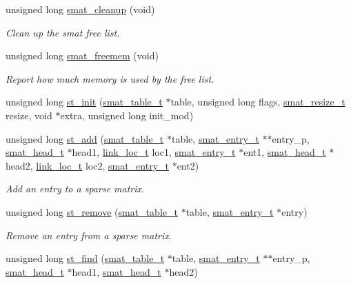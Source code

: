 \begin{CompactItemize}
\item 
unsigned long \hyperlink{group__dbprim__smat_a7}{smat\_\-cleanup} (void)
\begin{CompactList}\small\item\em Clean up the smat free list. \item\end{CompactList}\item 
unsigned long \hyperlink{group__dbprim__smat_a8}{smat\_\-freemem} (void)
\begin{CompactList}\small\item\em Report how much memory is used by the free list. \item\end{CompactList}\item 
unsigned long \hyperlink{group__dbprim__smat_a9}{st\_\-init} (\hyperlink{dbprim_8h_a0}{smat\_\-table\_\-t} $\ast$table, unsigned long flags, \hyperlink{dbprim_8h_a3}{smat\_\-resize\_\-t} resize, void $\ast$extra, unsigned long init\_\-mod)
\item 
unsigned long \hyperlink{group__dbprim__smat_a10}{st\_\-add} (\hyperlink{dbprim_8h_a0}{smat\_\-table\_\-t} $\ast$table, \hyperlink{dbprim_8h_a2}{smat\_\-entry\_\-t} $\ast$$\ast$entry\_\-p, \hyperlink{dbprim_8h_a1}{smat\_\-head\_\-t} $\ast$head1, \hyperlink{dbprim_8h_a4}{link\_\-loc\_\-t} loc1, \hyperlink{dbprim_8h_a2}{smat\_\-entry\_\-t} $\ast$ent1, \hyperlink{dbprim_8h_a1}{smat\_\-head\_\-t} $\ast$head2, \hyperlink{dbprim_8h_a4}{link\_\-loc\_\-t} loc2, \hyperlink{dbprim_8h_a2}{smat\_\-entry\_\-t} $\ast$ent2)
\begin{CompactList}\small\item\em Add an entry to a sparse matrix. \item\end{CompactList}\item 
unsigned long \hyperlink{group__dbprim__smat_a11}{st\_\-remove} (\hyperlink{dbprim_8h_a0}{smat\_\-table\_\-t} $\ast$table, \hyperlink{dbprim_8h_a2}{smat\_\-entry\_\-t} $\ast$entry)
\begin{CompactList}\small\item\em Remove an entry from a sparse matrix. \item\end{CompactList}\item 
unsigned long \hyperlink{group__dbprim__smat_a12}{st\_\-find} (\hyperlink{dbprim_8h_a0}{smat\_\-table\_\-t} $\ast$table, \hyperlink{dbprim_8h_a2}{smat\_\-entry\_\-t} $\ast$$\ast$entry\_\-p, \hyperlink{dbprim_8h_a1}{smat\_\-head\_\-t} $\ast$head1, \hyperlink{dbprim_8h_a1}{smat\_\-head\_\-t} $\ast$head2)

\end{CompactItemize}

